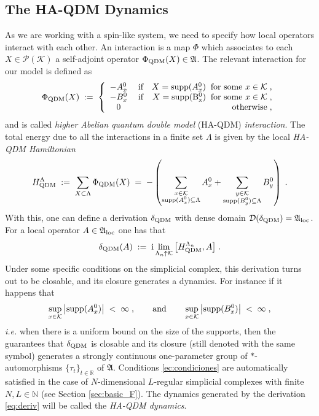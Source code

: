 \documentclass[a4paper,12pt,twoside,reqno]{amsart}
\theoremstyle{plain}
\theoremstyle{definition}
\theoremstyle{remark}
\numberwithin{equation}{section}
\numberwithin{figure}{section}
\numberwithin{table}{section}
\newcommand{\f}[1]{\mathcal{#1}}
\newcommand{\n}[1]{\mathbb{#1}}
\newcommand{\ab}[1]{\left| #1 \right|}
\begin{document}
	\subsection{The HA-QDM Dynamics}\label{sec:dyn}
	As we are working with a spin-like system, we need to specify how local operators interact with each other.
	An interaction is a map $\Phi$ which associates to each $X\in\f{P}(\f{K})$ a  self-adjoint operator $\Phi_{\rm QDM}(X)\in\mathfrak{A}$. The relevant interaction for our model is defined as 
	\begin{equation*}
		\Phi_{\rm QDM}(X)\;:=\;\left\{ \begin{array}{clr}
			-A_x^0&\; \text{if} & X={\rm supp}(A_x^0)\;\;%
			\text{for some $x\in \f{K}$}\;, \\
			-B_x^0&\; \text{if} & X={\rm {\rm supp}(B_x^0)}\;\; \text{for some $x\in \f{K}$}\;,\\
			0&\;& \text{otherwise}\;,
		\end{array} \right.
	\end{equation*}
	and is called \emph{higher Abelian quantum double model} (HA-QDM) \emph{interaction}.
	The total energy due to all the interactions in a finite set $\Lambda$ is given by the local \emph{HA-QDM Hamiltonian} 
	\begin{equation}\label{eq:ham}
		H^\Lambda_{\rm QDM}\;:=\;\sum_{X\subset \Lambda} \Phi_{\rm QDM}(X)\;=\;-\left(\sum_{\substack{x\in \f{K}\\
				{\rm supp}(A_x^0)\subseteq \Lambda }}A_x^0+\sum_{\substack{y\in \f{K}\\
				{\rm supp}(B_y^0)\subseteq \Lambda }}B_y^0\right)\;.
	\end{equation}
	With this, one can define a derivation $\delta_{\rm QDM}$ with dense domain
	$\f{D}(\delta_{\rm QDM})=\mathfrak{A}_{\rm loc}$.
	For a local operator $A\in \mathfrak{A}_{\rm loc}$ one has that
	\begin{equation}\label{eq:deriv}
		\delta_{\rm QDM}(A)\;:=\;{\rm i}\lim_{\Lambda_n\uparrow \f{K}}\big[H_{\rm QDM}^{\Lambda_n},A\big]\;.
	\end{equation}
	Under some specific conditions on the simplicial complex, this derivation turns out to be closable, and its closure generates a dynamics. 
	For instance if it happens that
	\begin{equation}\label{ec:condiciones}
		\sup_{x\in \f{K}} \ab{ {\rm supp}(A_x^0)}\;<\;\infty\;,\qquad \text{and}\qquad \sup_{x\in \f{K}} \ab{{\rm supp}(B_x^0)}\;<\;\infty\;,
	\end{equation}
	\emph{i.e.} when there is a uniform bound on the size of the supports, 
	then the \cite[Theorem 6.2.4]{bratelli2} guarantees that $\delta_{\rm QDM}$ is closable and its closure (still denoted with the same symbol) generates a strongly continuous one-parameter group of $*$-automorphisms $\{\tau_t\}_{t\in\n{R}}$ of $\mathfrak{A}$. 
	Conditions \eqref{ec:condiciones} are automatically satisfied in the case of 
	$N$-dimensional $L$-regular
	simplicial complexes with finite  $N,L\in\n{N}$ (see Section \ref{sec:basic_F}).
	The dynamics generated by the derivation \eqref{eq:deriv} will be called the \emph{HA-QDM dynamics}.
	
\end{document}
